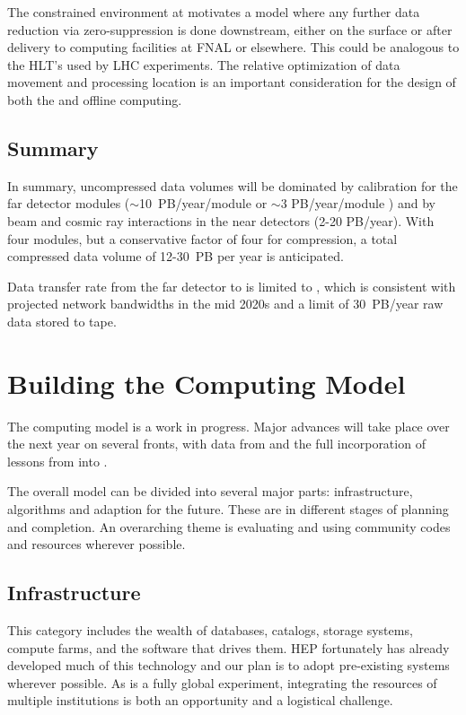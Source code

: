 The constrained environment at \surf motivates a model where any further data reduction via zero-suppression is done downstream, either on the surface or after delivery to computing facilities at FNAL or elsewhere. This could be analogous to the HLT's used by LHC experiments. The relative optimization of data movement and processing location is an important consideration for the design of both the  and offline computing.

\subsection{Summary}
In summary, uncompressed data volumes will be dominated by calibration for the far detector modules ($\sim$10~PB/year/module  or $\sim$3 PB/year/module ) and by beam and cosmic ray interactions in the near detectors (2-20 PB/year).   With four  modules, but a conservative factor of four for compression, a total compressed data volume of 12-30~PB per year is anticipated. 


Data transfer rate from the far detector to \fnal  is limited to \surffnalbw, which is consistent with projected network bandwidths in the mid 2020s and a limit of 30~PB/year raw data stored to tape.  



\section{Building the Computing Model}\label{sw:bld-cmp-mdl}

The   computing model is a work in progress.  Major advances will take place over the next year on several fronts, with data from  and the full incorporation of lessons from   into  . 


The overall model can be divided into several major parts:  infrastructure, algorithms and adaption for the future.  These are in different stages of planning and completion.  An overarching theme is evaluating and using community codes and resources wherever possible. 



\subsection{Infrastructure}
This category includes the wealth of databases, catalogs, storage systems, compute farms, and the software that drives them.  HEP fortunately has already developed much of this technology and our plan is to adopt pre-existing systems wherever possible.  As   is a fully global experiment, integrating the resources of multiple institutions is both an opportunity and a logistical challenge.

